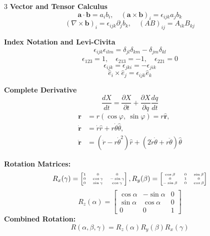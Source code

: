 \documentclass[1pt]{article}
\begin{document}
\begin{multicols}{3}
\textbf{Vector and Tensor Calculus}
\begin{equation*}
    \mathbf{a} \cdot \mathbf{b} = a_i b_i, \quad    ( \mathbf{a} \times \mathbf{b} )_i = \epsilon_{ijk} a_j b_k
\end{equation*}
\begin{equation*}
    (\nabla \times \mathbf{b})_i = \epsilon_{ijk} \partial_j b_k ,\quad  (AB)_{ij} = A_{ik} B_{kj}
\end{equation*}


\textbf{Index Notation and Levi-Civita}
\begin{equation*}
    \epsilon_{ijk} \epsilon_{ilm} = \delta_{jl} \delta_{km} - \delta_{jm} \delta_{kl}
\end{equation*}
\begin{align*}
    \epsilon_{123}=1,\quad \epsilon_{213}=-1,\quad \epsilon_{221}=0
\end{align*}
\begin{equation*}
    \epsilon_{ijk}= \epsilon_{jki} = -\epsilon_{jik}
\end{equation*}
\begin{equation*}
    \hat{e}_i \times \hat{e}_j=\epsilon_{ijk} \hat{e}_k
\end{equation*}

\textbf{Complete Derivative}
\begin{equation*}
    \frac{d X}{d t}=\frac{\partial X}{\partial t}+\frac{\partial X}{\partial q} \frac{d q}{d t} 
\end{equation*}
\begin{align*}
    \mathbf{r}  &= r(\cos\varphi,\ \sin\varphi) = r \hat{\mathbf{r}}, \\[1ex]
   \dot{\mathbf{r}} &= \dot{r}\hat{r}+r\dot{\theta}\hat{\theta}, \\[1ex]
  \ddot{\mathbf{r}} &= (\ddot{r}-r\dot{\theta}^2)\hat{r}+(2\dot{r}\dot{\theta}+r\ddot{\theta})\hat{\theta}
\end{align*}

\textbf{Rotation Matrices:}
\[
\tiny R_x(\gamma) =
\begin{bmatrix}
1 & 0 & 0 \\
0 & \cos\gamma & -\sin\gamma \\
0 & \sin\gamma & \cos\gamma
\end{bmatrix},\tiny
R_y(\beta) =
\begin{bmatrix}
\cos\beta & 0 & \sin\beta \\
0 & 1 & 0 \\
-\sin\beta & 0 & \cos\beta
\end{bmatrix}
\]
\tiny
\[
R_z(\alpha) =
\begin{bmatrix}
\cos\alpha & -\sin\alpha & 0 \\
\sin\alpha & \cos\alpha & 0 \\
0 & 0 & 1
\end{bmatrix}
\]
\textbf{Combined Rotation:}  
\[
R(\alpha, \beta, \gamma) = R_z(\alpha) R_y(\beta) R_x(\gamma)
\]



\end{multicols}
\end{document}
